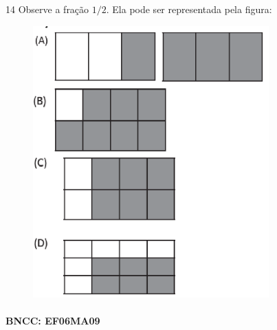 {%

\num{14} Observe a fração $1/2$. Ela pode ser representada pela figura:

\begin{figure}
\includegraphics[width=3.57531in,height=4.10869in]{./imgSAEB_6_MAT/media/image111.png}
\end{figure}

\paragraph{BNCC: EF06MA09 }


}
